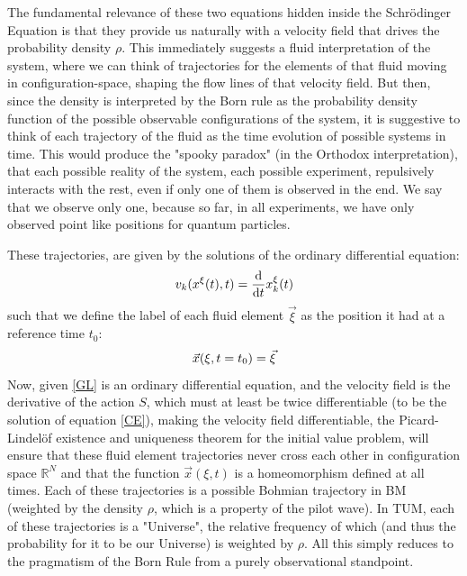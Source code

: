 \documentclass[11pt, a4paper]{article} %
\newcommand{\R}{\mathbb{R}} %
\begin{document}
The fundamental relevance of these two equations hidden inside the Schrödinger Equation is that they provide us naturally with a velocity field that drives the probability density $\rho$. This immediately suggests a fluid interpretation of the system, where we can think of trajectories for the elements of that fluid moving in configuration-space, shaping the flow lines of that velocity field. But then, since the density is interpreted by the Born rule as the probability density function of the possible observable configurations of the system, it is suggestive to think of each trajectory of the fluid  as the time evolution of possible systems in time. This would produce the "spooky paradox" (in the Orthodox interpretation), that each possible reality of the system, each possible experiment, repulsively interacts with the rest, even if only one of them is observed in the end. We say that we observe only one, because so far, in all experiments, we have only observed point like positions for quantum particles.

 These trajectories, are given by the solutions of the ordinary differential equation:\vspace{-0.1cm}
\begin{equation}\label{GL}
v_k(x^\xi(t),t)=\dv{}{t}x_k^\xi(t)\vspace{-0.1cm}
\end{equation}
such that we define the label of each fluid element $\vec{\xi}$ as the position it had at a reference time $t_0$:\vspace{-0.1cm}
\begin{equation}
\vec{x}(\xi,t=t_0)=\vec{\xi}\vspace{-0.1cm}
\end{equation}
Now, given \eqref{GL} is an ordinary differential equation, and the velocity field is the derivative of the action $S$, which must at least be twice differentiable (to be the solution of equation \eqref{CE}), making the velocity field differentiable, the Picard-Lindelöf existence and uniqueness theorem for the initial value problem, will ensure that these fluid element trajectories never cross each other in configuration space $\R^N$ and that the function $\vec{x}(\xi,t)$ is a homeomorphism defined at all times. Each of these trajectories is a possible Bohmian trajectory in BM (weighted by the density $\rho$, which is a property of the pilot wave). In TUM, each of these trajectories is a "Universe", the relative frequency of which (and thus the probability for it to be our Universe) is weighted by $\rho$. All this simply reduces to the pragmatism of the Born Rule from a purely observational standpoint.
\end{document}

